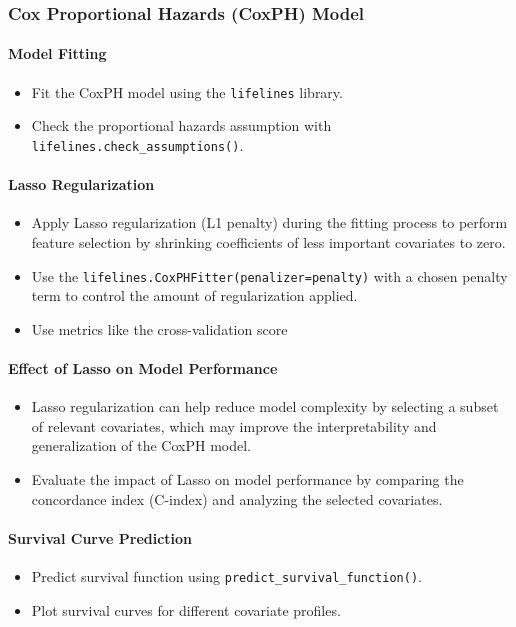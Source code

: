 \subsubsection*{Cox Proportional Hazards (CoxPH) Model}

\paragraph*{Model Fitting}
\begin{itemize}
    \item Fit the CoxPH model using the \texttt{lifelines} library.
    \item Check the proportional hazards assumption with \texttt{lifelines.check\_assumptions()}.
\end{itemize}

\paragraph*{Lasso Regularization}
\begin{itemize}
    \item Apply Lasso regularization (L1 penalty) during the fitting process to perform feature selection by shrinking coefficients of less important covariates to zero.
    \item Use the \texttt{lifelines.CoxPHFitter(penalizer=penalty)} with a chosen penalty term to control the amount of regularization applied. 
    \item Use metrics like the cross-validation score
\end{itemize}

\paragraph*{Effect of Lasso on Model Performance}
\begin{itemize}
    \item Lasso regularization can help reduce model complexity by selecting a subset of relevant covariates, which may improve the interpretability and generalization of the CoxPH model.
    \item Evaluate the impact of Lasso on model performance by comparing the concordance index (C-index) and analyzing the selected covariates.
\end{itemize}


\paragraph*{Survival Curve Prediction}
\begin{itemize}
    \item Predict survival function using \texttt{predict\_survival\_function()}.
    \item Plot survival curves for different covariate profiles.
\end{itemize}


